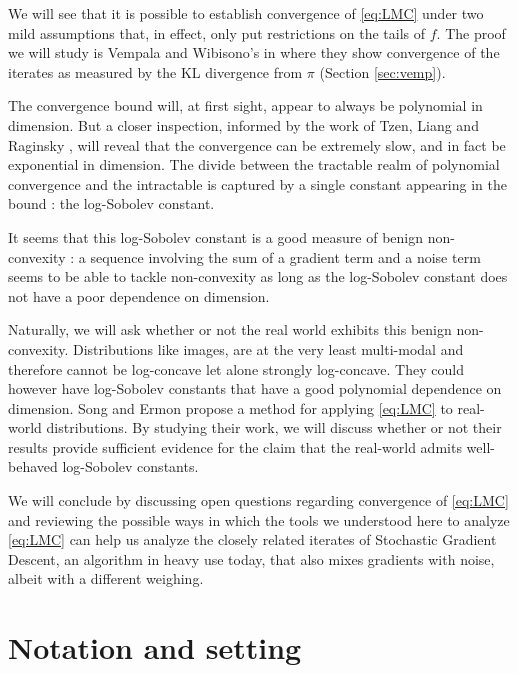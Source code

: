 \documentclass[11pt,twoside]{article}
\theoremstyle{definition}
\begin{document}
We will see that it is possible to establish convergence of \eqref{eq:LMC} under two mild assumptions that, in effect, only put restrictions on the tails of $f$. The proof we will study is Vempala and Wibisono's in \cite{vempala_rapid_2019} where they show convergence of the iterates as measured by the KL divergence from $\pi$ (Section \ref{sec:vemp}).

The convergence bound will, at first sight, appear to always be polynomial in dimension. But a closer inspection, informed by the work of Tzen, Liang and Raginsky \cite{tzen_local_2018}, will reveal that the convergence can be extremely slow, and in fact be exponential in dimension. The divide between the tractable realm of polynomial convergence and the intractable is captured by a single constant appearing in the bound : the log-Sobolev constant. 

It seems that this log-Sobolev constant is a good measure of benign non-convexity \cite{cheng_sharp_2020, li_escape_2021, pillaud-vivien_statistical_2020}: a sequence involving the sum of a gradient term and a noise term seems to be able to tackle non-convexity as long as the log-Sobolev constant does not have a poor dependence on dimension.

Naturally, we will ask whether or not the real world exhibits this benign non-convexity. Distributions like images, are at the very least multi-modal and therefore cannot be log-concave let alone strongly log-concave. They could however have log-Sobolev constants that have a good polynomial dependence on dimension. Song and Ermon propose a method for applying \eqref{eq:LMC} to real-world distributions. By studying their work, we will discuss whether or not  their results provide sufficient evidence for the claim that the real-world admits well-behaved log-Sobolev constants.

We will conclude by discussing open questions regarding convergence of \eqref{eq:LMC} and reviewing the possible ways in which the tools we understood here to analyze \eqref{eq:LMC} can help us analyze the closely related iterates of Stochastic Gradient Descent, an algorithm in heavy use today, that also mixes gradients with noise, albeit with a different weighing.

\section{Notation and setting}
\end{document}
